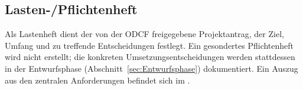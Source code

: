 \subsection{Lasten-/Pflichtenheft}
\label{sec:Lastenheft}
Als Lastenheft dient der von der \ac{ODCF} freigegebene Projektantrag,
der Ziel, Umfang und zu treffende Entscheidungen festlegt.
Ein gesondertes Pflichtenheft wird nicht erstellt; die konkreten
Umsetzungsentscheidungen werden stattdessen in der Entwurfsphase
(Abschnitt~\ref{sec:Entwurfsphase}) dokumentiert.
Ein Auszug aus den zentralen Anforderungen befindet sich im
.
